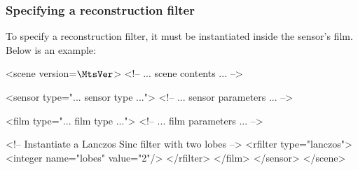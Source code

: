 \subsubsection{Specifying a reconstruction filter}
To specify a reconstruction filter, it must be instantiated inside
the sensor's film. Below is an example:
\begin{xml}
<scene version=$\MtsVer$>
    <!-- ... scene contents ... -->

    <sensor type="... sensor type ...">
        <!-- ... sensor parameters ... -->

        <film type="... film type ...">
            <!-- ... film parameters ... -->

            <!-- Instantiate a Lanczos Sinc filter with two lobes -->
            <rfilter type="lanczos">
                <integer name="lobes" value="2"/>
            </rfilter>
        </film>
    </sensor>
</scene>
\end{xml}
